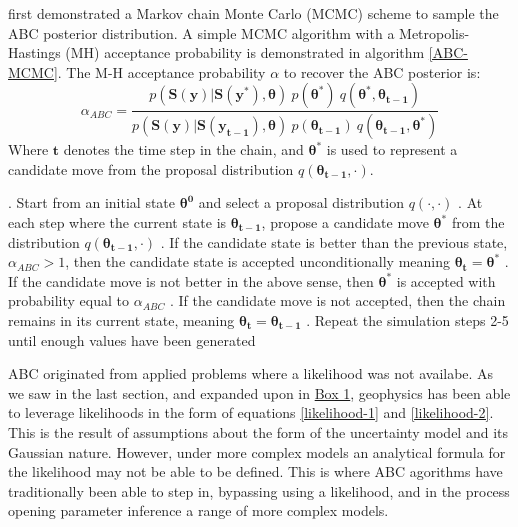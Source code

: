 \citet{Marjoram2003} first demonstrated a Markov chain Monte Carlo (MCMC) scheme to sample the ABC posterior distribution. A simple MCMC algorithm with a Metropolis-Hastings (MH) acceptance probability is demonstrated in algorithm \ref{ABC-MCMC}. The M-H acceptance probability $\alpha$ to recover the ABC posterior is:
\begin{equation}
\alpha_{ABC} = \frac{p(\bm{S}(\bm{y})|\bm{S}(\bm{y^*}),\bm{\theta})\ p(\bm{\theta^*})\ q(\bm{\theta^*},\bm{\theta_{t-1}})} {p(\bm{S}(\bm{y})|\bm{S}(\bm{y_{t-1}}),\bm{\theta})\ p(\bm{\theta_{t-1}})\ q(\bm{\theta_{t-1}},\bm{\theta^*})}
\label{M-H-acce}
\end{equation}
Where $\bm{t}$ denotes the time step in the chain, and $\bm{\theta^*}$ is used to represent a candidate move from the proposal distribution $q(\bm{\theta_{t-1}},\cdot)$.

\begin{algorithm}[H]
	\caption{ }
	\begin{algorithmic}
		. Start from an initial state $\bm{\theta^0}$ and select a proposal distribution $q(\cdot,\cdot)$
		. At each step where the current state is $\bm{\theta_{t-1}}$, propose a candidate 	move $\bm{\theta^*}$ from the distribution $q(\bm{\theta_{t-1}},\cdot)$		
		. If the candidate state is better than the previous state, $\alpha_{ABC} > 1$, then the candidate state is accepted unconditionally meaning $\bm{\theta_t} = \bm{\theta^*}$
		. If the candidate move is not better in the above sense, then $\bm{\theta^*}$ is accepted with probability equal to $\alpha_{ABC}$		
		. If the candidate move is not accepted, then the chain remains in its current state, meaning $\bm{\theta_{t}} = \bm{\theta_{t-1}}$		
		. Repeat the simulation steps 2-5 until enough values have been generated
	\end{algorithmic}
	\label{ABC-MCMC}
\end{algorithm}

ABC originated from applied problems where a likelihood was not availabe. As we saw in the last section, and expanded upon in \hyperref[Box1]{Box 1}, geophysics has been able to leverage likelihoods in the form of equations \ref{likelihood-1} and \ref{likelihood-2}. This is the result of assumptions about the form of the uncertainty model and its Gaussian nature. However, under more complex models an analytical formula for the likelihood may not be able to be defined. This is where ABC agorithms have traditionally been able to step in, bypassing using a likelihood, and in the process opening parameter inference a range of more complex models. \\

